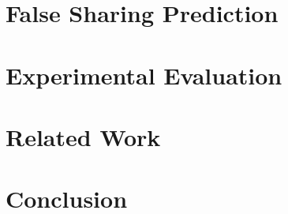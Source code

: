 \documentclass[9pt]{sigplanconf}
\begin{document}
\section{False Sharing Prediction}

%

\section{Experimental Evaluation}


\begin{comment}
\section{Discussion}
Whether performance matters?
Can we use the small input to predict possible false sharing then we actually do not need to 
run on big inputs.

Present data on this. How much we can use the small input to predict possible false sharing problem
which occurs in bigger input set.
%
\end{comment}

%
\section{Related Work}


\section{Conclusion}


%








%

{


}

\end{document}
